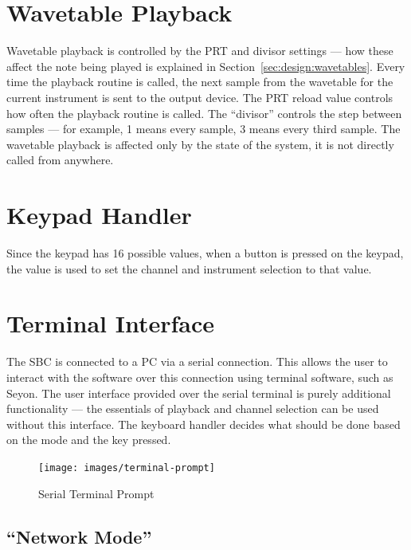 \section{Wavetable Playback}
\label{sec:overview:playback}

Wavetable playback is controlled by the PRT and divisor settings --- how these affect the note being 
played is explained in Section~\ref{sec:design:wavetables}.  Every time the playback routine is 
called, the next sample from the wavetable for the current instrument is sent to the output device.  
The PRT reload value controls how often the playback routine is called.  The ``divisor'' controls 
the step between samples --- for example, 1 means every sample, 3 means every third sample.  The 
wavetable playback is affected only by the state of the system, it is not directly called from 
anywhere.

\section{Keypad Handler}
\label{sec:overview:keypad}

Since the keypad has 16 possible values, when a button is pressed on the keypad, the value is used 
to set the channel and instrument selection to that value.  

\section{Terminal Interface}
\label{sec:overview:terminal}

The SBC is connected to a PC via a serial connection.  This allows the user to interact with the 
software over this connection using terminal software, such as Seyon.  The user interface provided 
over the serial terminal is purely additional functionality --- the essentials of playback and 
channel selection can be used without this interface.  The keyboard handler decides what should be 
done based on the mode and the key pressed.

\begin{figure}
\centering
\texttt{[image: images/terminal-prompt]}
\caption{Serial Terminal Prompt}\label{fig:terminal-prompt}
\end{figure}

\subsection{``Network Mode''}

